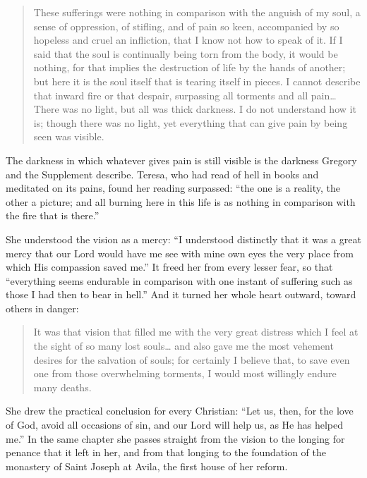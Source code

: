\begin{quote}
These sufferings were nothing in comparison with the anguish of my soul, a sense of oppression, of stifling, and of pain so keen, accompanied by so hopeless and cruel an infliction, that I know not how to speak of it. If I said that the soul is continually being torn from the body, it would be nothing, for that implies the destruction of life by the hands of another; but here it is the soul itself that is tearing itself in pieces. I cannot describe that inward fire or that despair, surpassing all torments and all pain\ldots{} There was no light, but all was thick darkness. I do not understand how it is; though there was no light, yet everything that can give pain by being seen was visible.
\end{quote}

\noindent The darkness in which whatever gives pain is still visible is the darkness Gregory and the Supplement describe. Teresa, who had read of hell in books and meditated on its pains, found her reading surpassed: ``the one is a reality, the other a picture; and all burning here in this life is as nothing in comparison with the fire that is there.''

She understood the vision as a mercy: ``I understood distinctly that it was a great mercy that our Lord would have me see with mine own eyes the very place from which His compassion saved me.'' It freed her from every lesser fear, so that ``everything seems endurable in comparison with one instant of suffering such as those I had then to bear in hell.'' And it turned her whole heart outward, toward others in danger:

\begin{quote}
It was that vision that filled me with the very great distress which I feel at the sight of so many lost souls\ldots{} and also gave me the most vehement desires for the salvation of souls; for certainly I believe that, to save even one from those overwhelming torments, I would most willingly endure many deaths.
\end{quote}

\noindent She drew the practical conclusion for every Christian: ``Let us, then, for the love of God, avoid all occasions of sin, and our Lord will help us, as He has helped me.'' In the same chapter she passes straight from the vision to the longing for penance that it left in her, and from that longing to the foundation of the monastery of Saint Joseph at Avila, the first house of her reform.

